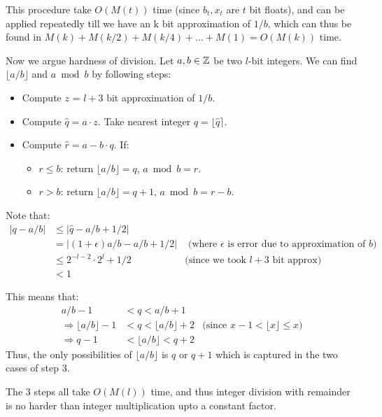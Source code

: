 This procedure take $O(M(t))$ time (since $b_t, x_t$ are $t$ bit floats), and can be applied repeatedly till we have an k bit approximation of $1/b$, which can thus be found in $M(k) + M(k/2) + M(k/4) + \ldots + M(1) = O(M(k))$ time.

Now we argue hardness of division. Let $a, b \in \mathbb{Z}$ be two $l$-bit integers. We can find \(\lfloor a/b \rfloor\) and \(a \bmod b\) by following steps:

\begin{itemize}
    \item Compute $z$ = $l+3$ bit approximation of $1/b$.
    \item Compute $\hat{q} = a \cdot z$. Take nearest integer $q = \lfloor \hat{q} \rceil$. 
    \item Compute $\hat{r} = a - b \cdot q$. If: 
    \begin{itemize}
        \item $r \le b$: return $\lfloor a/b \rfloor = q$, $a \bmod b = r$.
        \item $r > b$: return $\lfloor a/b \rfloor = q+1$, $a \bmod b = r-b$.
    \end{itemize}
\end{itemize}

Note that:
\begin{align*}
    |q - a/b| &\le |\hat{q} - a/b + 1/2| \\
    &= |(1+\epsilon) a/b - a/b + 1/2| &\text{ (where $\epsilon$ is error due to approximation of $b$)} \\
    &\le 2^{-l-2} \cdot 2^l + 1/2 &\text{(since we took $l+3$ bit approx)} \\
    &< 1
\end{align*}

This means that:
\begin{align*}
    a/b - 1 &< q < a/b + 1 \\
    \Rightarrow \lfloor a/b \rfloor - 1 &< q < \lfloor a/b \rfloor + 2&\text{(since $x -1 < \lfloor x \rfloor \le x$)} \\
    \Rightarrow q - 1 &< \lfloor a/b \rfloor < q + 2
\end{align*}
Thus, the only possibilities of $\lfloor a/b \rfloor$ is $q$ or $q+1$ which is captured in the two cases of step 3.

The 3 steps all take $O(M(l))$ time, and thus integer division with remainder is no harder than integer multiplication upto a constant factor.